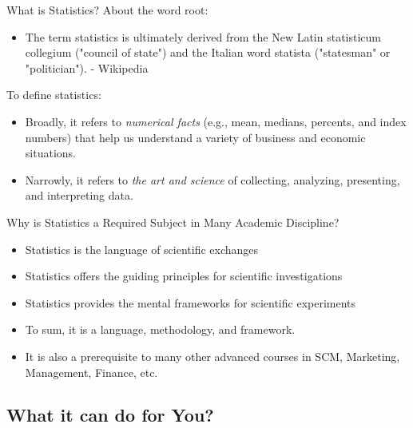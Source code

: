 \documentclass{beamer}
\begin{document}
\begin{frame}{What is Statistics?}
About the word root:
\begin{itemize}
\item The term statistics is ultimately derived from the New Latin statisticum collegium ("council of state") and the Italian word statista ("statesman" or "politician"). - Wikipedia
\end{itemize}

\vspace{0.3 cm}

To define statistics: 
\begin{itemize}
\item Broadly, it refers to \textit{numerical facts} (e.g., mean, medians, percents, and index numbers) that help us understand a variety of business and economic situations.
\item Narrowly, it refers to \textit{the art and science} of                                  collecting, analyzing, presenting, and interpreting data. 
\end{itemize}

\end{frame}


\begin{frame}{Why is Statistics a Required Subject in Many Academic Discipline?}
\begin{itemize}
\item Statistics is the language of scientific exchanges
\item Statistics offers the guiding principles for scientific investigations
\item Statistics provides the mental frameworks for scientific experiments 
\item To sum, it is a language, methodology, and framework.
\item It is also a prerequisite to many other advanced courses in SCM, Marketing, Management, Finance, etc. 
\end{itemize}


\end{frame}


\subsection{What it can do for You?}
\end{document}
